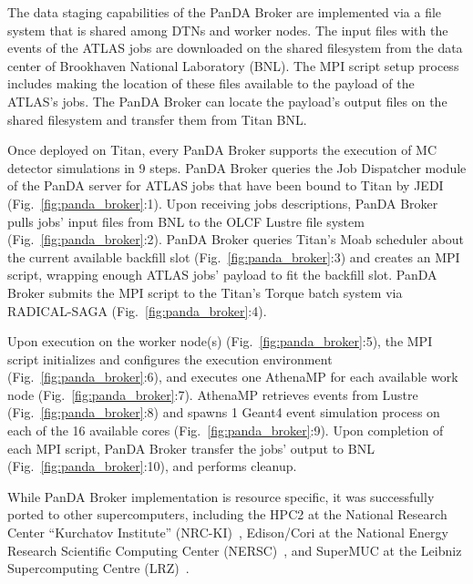 The data staging capabilities of the PanDA Broker are implemented via a file
system that is shared among DTNs and worker nodes. The input files with the
events of the ATLAS jobs are downloaded on the shared filesystem from the data
center of Brookhaven National Laboratory (BNL). The MPI script setup process
includes making the location of these files available to the payload of the
ATLAS's jobs. The PanDA Broker can locate the payload's output files on the
shared filesystem and transfer them from Titan BNL.

Once deployed on Titan, every PanDA Broker supports the execution of MC detector
simulations in 9 steps. PanDA Broker queries the Job Dispatcher module of the
PanDA server for ATLAS jobs that have been bound to Titan by JEDI
(Fig.~\ref{fig:panda_broker}:1). Upon receiving jobs descriptions, PanDA Broker
pulls jobs' input files from BNL to the OLCF Lustre file system
(Fig.~\ref{fig:panda_broker}:2). PanDA Broker queries Titan's Moab scheduler
about the current available backfill slot (Fig.~\ref{fig:panda_broker}:3) and
creates an MPI script, wrapping enough ATLAS jobs' payload to fit the backfill
slot. PanDA Broker submits the MPI script to the Titan's Torque batch system via
RADICAL-SAGA (Fig.~\ref{fig:panda_broker}:4).

Upon execution on the worker node(s) (Fig.~\ref{fig:panda_broker}:5), the MPI
script initializes and configures the execution environment
(Fig.~\ref{fig:panda_broker}:6), and executes one AthenaMP for each available
work node (Fig.~\ref{fig:panda_broker}:7). AthenaMP retrieves events from Lustre
(Fig.~\ref{fig:panda_broker}:8) and spawns 1 Geant4 event simulation process on
each of the 16 available cores (Fig.~\ref{fig:panda_broker}:9). Upon completion
of each MPI script, PanDA Broker transfer the jobs' output to BNL
(Fig.~\ref{fig:panda_broker}:10), and performs cleanup.

While PanDA Broker implementation is resource specific, it was successfully
ported to other supercomputers, including the HPC2 at the National Research
Center ``Kurchatov Institute'' (NRC-KI)~\cite{belyaev2015integration},
Edison/Cori at the National Energy Research Scientific Computing Center
(NERSC)~\cite{barreiro2016panda}, and SuperMUC at the Leibniz Supercomputing
Centre (LRZ)~\cite{barreiro2016panda}.
